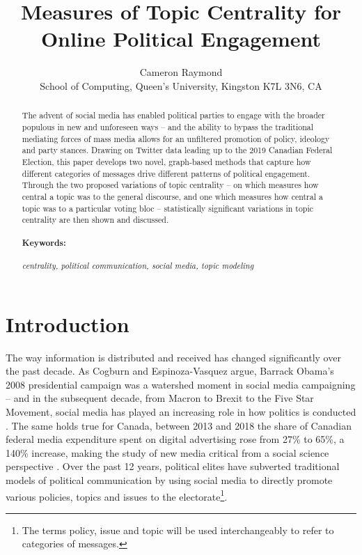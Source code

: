 \documentclass{nws}
\title[Measures of Topic Centrality for Online Political Engagement]
      {Measures of Topic Centrality for Online Political Engagement}
\author[C.J.K Raymond]
        {Cameron Raymond\\
        School of Computing, Queen's University, Kingston K7L 3N6, CA\\
         \email{c.raymond@queensu.ca}}
\begin{document}
\label{firstpage}

\maketitle

\begin{abstract}
  The advent of social media has enabled political parties to engage with the
  broader populous in new and unforeseen ways -- and the ability to bypass the
  traditional mediating forces of mass media allows for an unfiltered promotion
  of policy, ideology and party stances. Drawing on Twitter data leading up to
  the 2019 Canadian Federal Election, this paper develops two novel, graph-based methods that
  capture how different categories of messages drive different patterns of political
  engagement. Through the two proposed variations of topic centrality -- on which
  measures how central a topic was to the general discourse, and one which
  measures how central a topic was to a particular voting bloc -- statistically
  significant variations in topic centrality are then shown and discussed. %
  \paragraph{Keywords:} \emph{centrality, political communication, social media, topic modeling}
\end{abstract}

\tableofcontents

\section{Introduction}

The way information is distributed and received has changed significantly over
the past decade. As Cogburn and Espinoza-Vasquez argue, Barrack Obama’s 2008
presidential campaign was a watershed moment in social media campaigning – and
in the subsequent decade, from Macron to Brexit to the Five Star Movement,
social media has played an increasing role in how politics is conducted
\cite{cogburn2011networked}.  The same holds true for Canada, between 2013 and
2018 the share of Canadian federal media expenditure spent on digital
advertising rose from 27\% to 65\%, a 140\% increase, making the study of new
media critical from a social science perspective
\cite{annualReportCanadaAdvertisingActivities_2018}. Over the past 12 years,
political elites have subverted traditional models of political communication by
using social media to directly promote various policies, topics and issues to
the electorate\footnote{The
terms policy, issue and topic will be used interchangeably to refer to
categories of messages.}\cite{mcnair2017introduction}.
\end{document}
